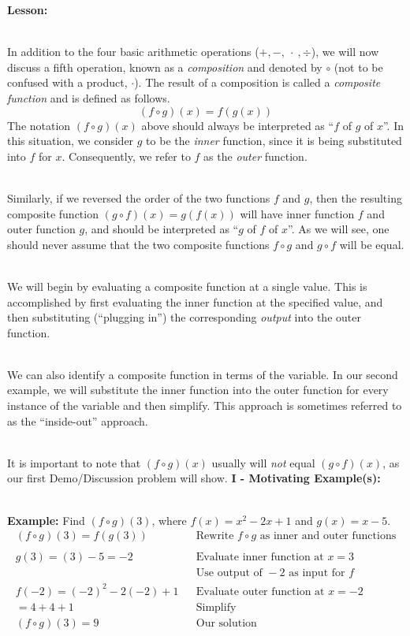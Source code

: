 \documentclass[12pt]{article}
\theoremstyle{definition}
\begin{document}
{\bf Lesson:}\\
\ \par
In addition to the four basic arithmetic operations ($+,-,~\cdot~,\div$), we will now discuss a fifth operation, known as a {\it composition} and denoted by $\circ$ (not to be confused with a product, $\cdot$). The result of a composition is called a {\it composite function} and is defined as follows.
\[(f \circ g) (x) = f (g (x))\]
The notation $(f\circ g)(x)$ above should always be interpreted as ``$f$ of $g$ of $x$''.  In this situation, we consider $g$ to be the {\it inner} function, since it is being substituted into $f$ for $x$.  Consequently, we refer to $f$ as the {\it outer} function.\\
\ \par
Similarly, if we reversed the order of the two functions $f$ and $g$, then the resulting composite function $(g\circ f)(x)=g(f(x))$ will have inner function $f$ and outer function $g$, and should be interpreted as ``$g$ of $f$ of $x$''.  As we will see, one should never assume that the two composite functions $f\circ g$ and $g\circ f$ will be equal.\\
\ \par
We will begin by evaluating a composite function at a single value.  This is accomplished by first evaluating the inner function at the specified value, and
then substituting (``plugging in'') the corresponding {\it output} into the outer function.\\
\ \par
We can also identify a composite function in terms of the variable. In our second example, we will substitute the inner function into the outer function for every instance of the variable and then simplify.  This approach is sometimes referred to as the ``inside-out'' approach.\\
\ \par
It is important to note that $(f \circ g) (x)$ usually will {\it not} equal $(g\circ f) (x)$, as our first Demo/Discussion problem will show.
\newpage
{\bf I - Motivating Example(s):}\\
\ \par
{\bf Example:} Find $(f\circ g)(3)$, where $f(x)=x^2-2x+1$ and $g(x)=x-5$.
  \begin{eqnarray*}
   (f \circ g) (3)=f (g (3)) &  & \text{Rewrite~} f\circ g \text{~as~inner~and~outer~functions}\\
	    &  & \\
 	g (3) = (3) - 5 = - 2~~~~~~~ &  & \text{Evaluate~inner~function~at~} x=3\\
		& & \text{Use~output~of~} -2 \text{~as~input~for~} f\\
    f (- 2) = (- 2)^2 - 2 (- 2) + 1 &  & \text{Evaluate~outer~function~at~} x=-2\\
    = 4 + 4 + 1~~~~~~~~~~~~ &  & \text{Simplify}\\
		(f \circ g) (3) = 9 &  & \text{Our solution}
  \end{eqnarray*}
\end{document}
